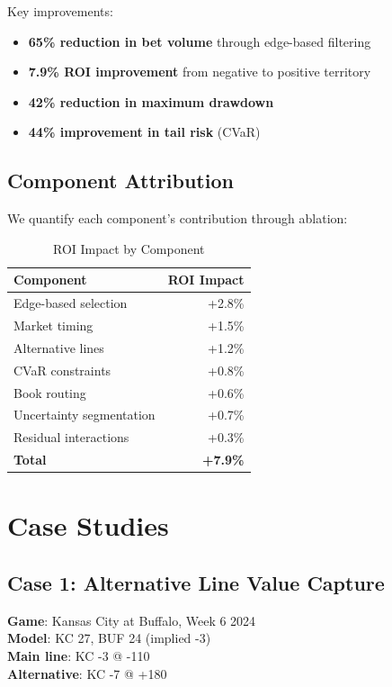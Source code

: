 Key improvements:
\begin{itemize}
  \item \textbf{65\% reduction in bet volume} through edge-based filtering
  \item \textbf{7.9\% ROI improvement} from negative to positive territory
  \item \textbf{42\% reduction in maximum drawdown}
  \item \textbf{44\% improvement in tail risk} (CVaR)
\end{itemize}

\subsection{Component Attribution}

We quantify each component's contribution through ablation:

\begin{table}[!ht]
\centering
\caption{ROI Impact by Component}
\begin{tabular}{lr}
\toprule
 \textbf{Component} & \textbf{ROI Impact} \\
\midrule
Edge-based selection & +2.8\% \\
Market timing & +1.5\% \\
Alternative lines & +1.2\% \\
CVaR constraints & +0.8\% \\
Book routing & +0.6\% \\
Uncertainty segmentation & +0.7\% \\
Residual interactions & +0.3\% \\
\midrule
\textbf{Total} & \textbf{+7.9\%} \\
\bottomrule
\end{tabular}
\end{table}

\section{Case Studies}

\subsection{Case 1: Alternative Line Value Capture}

\textbf{Game}: Kansas City at Buffalo, Week 6 2024\\
\textbf{Model}: KC 27, BUF 24 (implied -3)\\
\textbf{Main line}: KC -3 @ -110\\
\textbf{Alternative}: KC -7 @ +180

